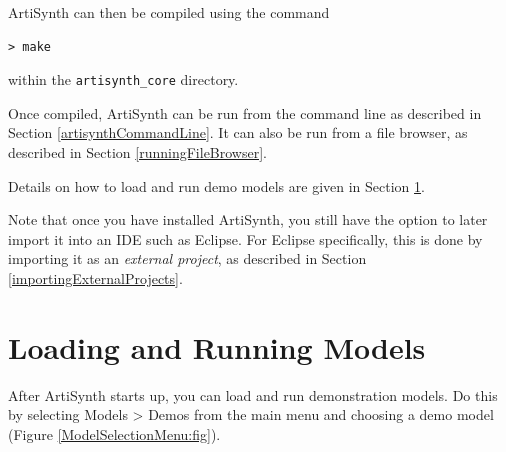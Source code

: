ArtiSynth can then be compiled using the command
%
\begin{lstlisting}[]
 > make
\end{lstlisting}
%
within the {\tt artisynth\_core} directory.
\fi %

Once compiled, ArtiSynth can be run from the command line as described
in Section \ref{artisynthCommandLine}.
\ifMacOS
It can also be run from a file browser, as described
in Section \ref{runningFileBrowser}.
\fi
%
\fi %

Details on how to load and run demo models are given in
Section \ref{Running}.

Note that once you have installed ArtiSynth, you still have the option
to later import it into an IDE such as Eclipse. For Eclipse
specifically, this is done by importing it as an {\it external
project}, as described in Section \ref{importingExternalProjects}.

\section{Loading and Running Models}
\label{Running}

After ArtiSynth starts up, you can load and run demonstration
models. Do this by selecting {\sf Models > Demos} from the main menu
and choosing a demo model (Figure \ref{ModelSelectionMenu:fig}).

